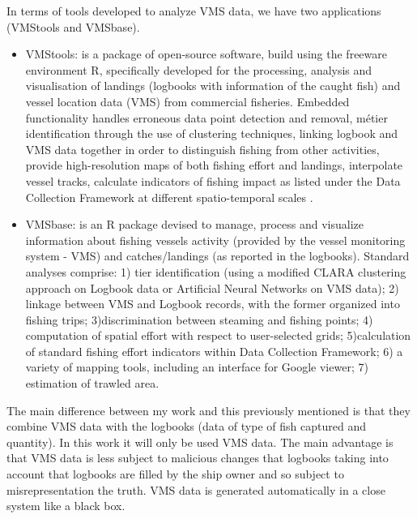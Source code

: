 In terms of tools developed to analyze VMS data, we have two applications (VMStools and VMSbase).
\begin{itemize}
\item	VMStools: is a package of open-source software, build using the freeware environment R, specifically developed for the processing, analysis and visualisation of landings (logbooks with information of the caught fish) and vessel location data (VMS) from commercial fisheries. Embedded functionality handles erroneous data point detection and removal, métier identification through the use of clustering techniques, linking logbook and VMS data together in order to distinguish fishing from other activities, provide high-resolution maps of both fishing effort and landings, interpolate vessel tracks, calculate indicators of fishing impact as listed under the Data Collection Framework at different spatio-temporal scales \cite{DeporteVMStools}.


\item	VMSbase: is an R package devised to manage, process and visualize information about fishing vessels activity (provided by the vessel monitoring system - VMS) and catches/landings (as reported in the logbooks).
Standard analyses comprise: 1) tier identification (using a modified CLARA clustering approach on Logbook data or Artificial Neural
Networks on VMS data); 2) linkage between VMS and Logbook records, with the former organized into fishing trips; 3)discrimination between steaming and fishing points; 4) computation of spatial effort with respect to user-selected grids; 5)calculation of standard fishing effort indicators within Data Collection Framework; 6) a variety of mapping tools, including an interface for Google viewer; 7) estimation of trawled area\cite{RussoVMSbase}.
\end{itemize}


The main difference between my work and this previously mentioned is that they combine VMS data with the logbooks (data of type of fish captured and quantity).
In this work it will only be used VMS data. 
The main advantage is that VMS data is less subject to malicious changes that logbooks taking into account that logbooks are filled by the ship owner and so subject to misrepresentation the truth. VMS data is generated automatically in a close system like a black box. 


